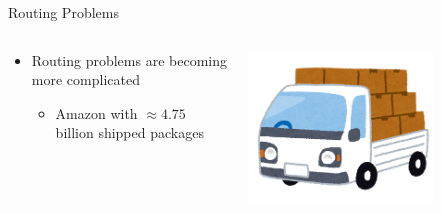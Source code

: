 \begin{frame}{Routing Problems}
	\begin{columns}
		\begin{column}{0.48\textwidth}
			\begin{itemize}
				\item<1-> Routing problems are becoming more complicated \begin{itemize}
					\item<2-> Amazon with $\approx 4.75$ billion shipped packages \cite{placek_amazon_2022}
				\end{itemize}
			\end{itemize}
		\end{column}
		\begin{column}{0.48\textwidth}
			\includegraphics[width=0.7\textwidth]{res/truck_nimotsu.png}
		\end{column}
	\end{columns}

\end{frame}


